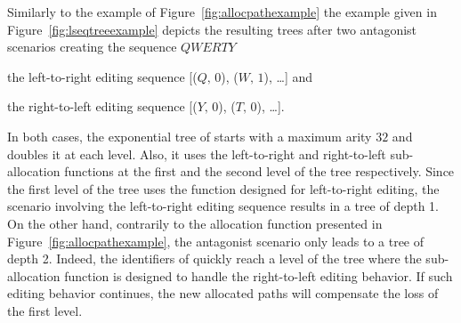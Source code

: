 Similarly to the example of Figure~\ref{fig:allocpathexample} the example given
in Figure~\ref{fig:lseqtreeexample} depicts the resulting trees after two
antagonist scenarios creating the sequence
$QWERTY$ \begin{inparaenum}[(i)] \item the left-to-right editing sequence
  [($Q,\,0$), ($W,\,1$), \ldots] and \item the right-to-left editing sequence
  [($Y,\,0$), ($T,\,0$), \ldots]. \end{inparaenum} In both cases, the
exponential tree of \LSEQ starts with a maximum arity $32$ and doubles it at
each level. Also, it uses the left-to-right and right-to-left sub-allocation
functions at the first and the second level of the tree respectively. Since the
first level of the tree uses the function designed for left-to-right editing,
the scenario involving the left-to-right editing sequence results in a tree of
depth 1. On the other hand, contrarily to the allocation function presented in
Figure~\ref{fig:allocpathexample}, the antagonist scenario only leads to a tree
of depth 2. Indeed, the identifiers of \LSEQ quickly reach a level of the tree
where the sub-allocation function is designed to handle the right-to-left
editing behavior. If such editing behavior continues, the new allocated paths
will compensate the loss of the first level. 


